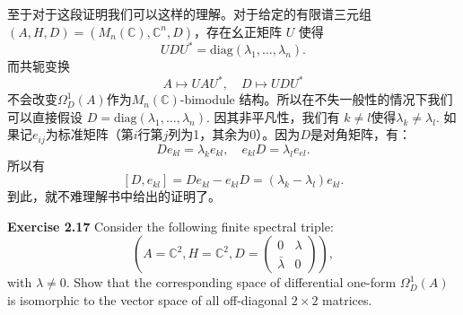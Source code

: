 至于对于这段证明我们可以这样的理解。对于给定的有限谱三元组 $(A, H, D)=(M_n(\mathbb{C}), \mathbb{C}^n, D)$，存在幺正矩阵 $U$ 使得
\[UDU^*=\text{diag}(\lambda_1,\ldots, \lambda_n).\]
而共轭变换
\[A\mapsto UAU^*,\quad D\mapsto UDU^*\]
不会改变$\Omega_D^1(A)$作为$M_n(\mathbb{C})$-bimodule 结构。所以在不失一般性的情况下我们可以直接假设 $D=\text{diag}(\lambda_1,\ldots, \lambda_n).$ 因其非平凡性，我们有 $k\neq l$使得$\lambda_k\neq\lambda_l$. 如果记$e_{ij}$为标准矩阵（第$i$行第$j$列为1，其余为0）。因为$D$是对角矩阵，有：
\[De_{kl}=\lambda_ke_{kl}, \quad e_{kl}D=\lambda_le_{el}.\]
所以有
\[[D,e_{kl}]=De_{kl}-e_{kl}D=(\lambda_k-\lambda_l)e_{kl}.\]
到此，就不难理解书中给出的证明了。

\textbf{Exercise 2.17} Consider the following finite spectral triple:
\[
\left(A=\mathbb{C}^2, H=\mathbb{C}^2, D=\begin{pmatrix}
 0&\lambda\\ \bar{\lambda}&0   
\end{pmatrix}\right),
\]
with $\lambda\neq0$. Show that the corresponding space of differential one-form $\Omega_D^1(A)$ is isomorphic to the vector space of all off-diagonal $2\times2$ matrices.

